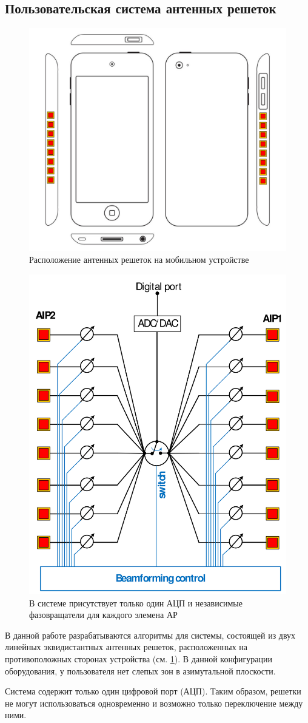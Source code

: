 \subsection{Пользовательская система антенных решеток}

\begin{figure}[ht]
    \centering
    \includegraphics[width=0.5\linewidth]{figs/fig4.3}
    \caption{Расположение антенных решеток на мобильном устройстве}
    \label{fig:4.3}
\end{figure}

\begin{figure}[ht]
    \centering
    \includegraphics[width=0.4\linewidth]{figs/fig4.4}
    \caption{В системе присутствует только один АЦП и независимые фазовращатели для каждого элемена АР}
    \label{fig:4.4}
\end{figure}

В данной работе разрабатываются алгоритмы для системы, состоящей из двух линейных эквидистантных антенных решеток, расположенных на противоположных сторонах
устройства (см. \ref{fig:4.3}). В данной конфигурации оборудования, у пользователя нет слепых зон в азимутальной плоскости.

Система содержит только один цифровой порт (АЦП). Таким образом, решетки не могут
использоваться одновременно и возможно только переключение между ними.


